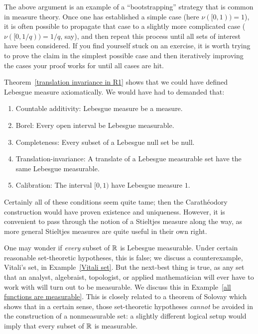\begin{subsec}
The above argument is an example of a ``bootstrapping'' strategy that is common in measure theory.
Once one has established a simple case (here $\nu([0, 1)) = 1$), it is often possible to propagate that case to a slightly more complicated case ($\nu([0, 1/q)) = 1/q$, say), and then repeat this process until all sets of interest have been considered.
If you find yourself stuck on an exercise, it is worth trying to prove the claim in the simplest possible case and then iteratively improving the cases your proof works for until all cases are hit.
\end{subsec}

\begin{subsec}
Theorem~\ref{translation invariance in R1} shows that we could have defined Lebesgue measure axiomatically. We would have had to demanded that:
\begin{enumerate}
\item Countable additivity: Lebesgue measure be a measure.
\item Borel: Every open interval be Lebesgue measurable.
\item Completeness: Every subset of a Lebesgue null set be null.
\item Translation-invariance: A translate of a Lebesgue measurable set have the same Lebesgue measurable.
\item Calibration: The interval $[0, 1)$ have Lebesgue measure $1$.
\end{enumerate}
Certainly all of these conditions seem quite tame; then the Carathéodory construction would have proven existence and uniqueness.
However, it is convenient to pass through the notion of a Stieltjes measure along the way, as more general Stieltjes measures are quite useful in their own right.
\end{subsec}

\begin{subsec}
One may wonder if \emph{every} subset of $\mathbb{R}$ is Lebesgue measurable.
Under certain reasonable set-theoretic hypotheses, this is false; we discuss a counterexample, Vitali's set, in Example~\ref{Vitali set}.
But the next-best thing is true, as any set that an analyst, algebraist, topologist, or applied mathematician will ever have to work with will turn out to be measurable. We discuss this in Example~\ref{all functions are measurable}.
This is closely related to a theorem of Solovay \cite{Solovay1970} which shows that in a certain sense, those set-theoretic hypotheses \emph{cannot} be avoided in the construction of a nonmeasurable set: a slightly different logical setup would imply that every subset of $\mathbb{R}$ is measurable.
\end{subsec}

